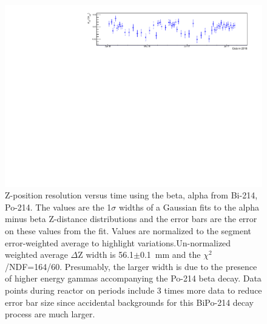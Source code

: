 \begin{figure}[!h]
\centering
\includegraphics[width=1.05\textwidth]{figures/PubBiPo214ZresvsT.pdf}
\caption{\label{fig:ZresvsT214}Z-position resolution versus time using the beta, alpha from Bi-214, Po-214. The values are the 1$\sigma$ widths of a Gaussian fits to the alpha minus beta Z-distance distributions and the error bars are the error on these values from the fit. Values are normalized to the segment error-weighted average to highlight variations.Un-normalized weighted average $\Delta$Z width is 56.1$\pm$0.1~mm and the $\chi^2$/NDF=164/60. Presumably, the larger width is due to the presence of higher energy gammas accompanying the Po-214 beta decay. Data points during reactor on periods include 3 times more data to reduce error bar size since accidental backgrounds for this BiPo-214 decay process are much larger.}
\end{figure}
\newpage
